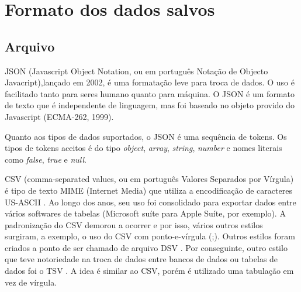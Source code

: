 \documentclass[
	12pt,				%
	openright,			%
	twoside,			%
	a4paper,			%
	english,			%
	brazil				%
	]{abntex2}
\begin{document}

	\section{Formato dos dados salvos}
		\subsection{Arquivo}
		JSON \cite{json-rfc-8259} \cite{json-jsonOrg} (Javascript Object Notation, ou em português Notação de Objecto Javacript),lançado em 2002, é uma formatação leve para troca de dados. 
		O uso é facilitado tanto para seres humano quanto para máquina.
		O JSON é um formato de texto que é independente de linguagem, mas foi baseado no objeto provido do Javascript (ECMA-262, 1999).
		\par
		Quanto aos tipos de dados suportados, o JSON \cite{json-rfc-8259} é uma sequência de tokens. 
		Os tipos de tokens aceitos é do tipo \textit{object}, \textit{array}, \textit{string}, \textit{number} e nomes literais como \textit{false}, \textit{true} e \textit{null}.
		\par
		CSV \cite{csv-rfc-4180} (comma-separated values, ou em português Valores Separados por Vírgula) é tipo de texto MIME (Internet Media) \cite{mime-rfc-2048} que utiliza a encodificação de caracteres US-ASCII \cite{csv-rfc-7111}.
		Ao longo dos anos, seu uso foi consolidado para exportar dados entre vários softwares de tabelas (Microsoft suíte para Apple Suíte, por exemplo).
		A padronização do CSV demorou a ocorrer e por isso, vários outros estilos surgiram, a exemplo, o uso do CSV com ponto-e-vírgula (;).
		Outros estilos foram criados a ponto de ser chamado de arquivo DSV \cite{dsv}.
		Por conseguinte, outro estilo que teve notoriedade na troca de dados entre bancos de dados ou tabelas de dados foi o TSV \cite{tsv-iana}.
		A idea é similar ao CSV, porém é utilizado uma tabulação em vez de vírgula.
		
\end{document}
